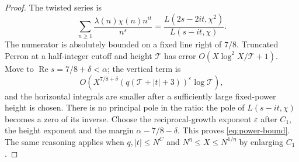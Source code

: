 \documentclass[11pt]{article}
\theoremstyle{definition}
\DeclareMathOperator{\Rea}{Re}
\theoremstyle{remark}
\begin{document}
\begin{proof}
The twisted series is
\begin{equation}\label{eq:liouville-series}
\sum_{n\ge1}\frac{\lambda(n)\chi(n)n^{it}}{n^s}
=\frac{L(2s-2it,\chi^2)}{L(s-it,\chi)}.
\end{equation}
The numerator is absolutely bounded on a fixed line right of $7/8$.
Truncated Perron at a half-integer cutoff and height $\mathcal T$
has error $O(X\log^2X/\mathcal T+1)$.
Move to $\Rea s=7/8+\delta<\alpha$; the vertical term is
\begin{equation}\label{eq:perron-vertical}
O\left(X^{7/8+\delta}
       (q(\mathcal T+|t|+3))^\varepsilon\log\mathcal T\right),
\end{equation}
and the horizontal integrals are smaller after a sufficiently large
fixed-power height is chosen. There is no principal pole in the ratio:
the pole of $L(s-it,\chi)$ becomes a zero of its inverse.
Choose the reciprocal-growth exponent $\varepsilon$ after $C_1$,
the height exponent and the margin $\alpha-7/8-\delta$.
This proves \eqref{eq:power-bound}. The same reasoning applies when
$q,|t|\le N^C$ and $N^\eta\le X\le N^{1/\eta}$ by enlarging $C_1$.
\end{proof}
\end{document}
